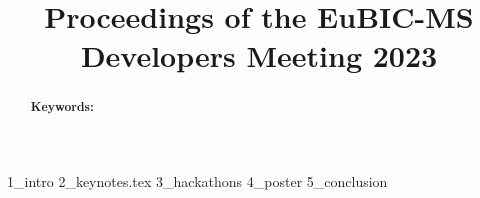 \documentclass[11pt,a4paper,DIV=21,abstract=true,twocolumn]{scrartcl}
\title{Proceedings of the EuBIC-MS Developers Meeting 2023}
\author{
	
}
\date{{\small Osaka \begin{CJK}{UTF8}{min}大阪市\end{CJK}, Japan, \today\ at \currenttime}}
\begin{document}
\maketitle

\begin{abstract}
	
	\vspace{0.5cm}
	\textbf{Keywords:
	}
	
\end{abstract}


 {1_intro}
 {2_keynotes.tex}
 {3_hackathons}
 {4_poster}
 {5_conclusion}

%

%


\begin{table*}[ht]
\centering
\label{tab:affiliation}

\caption{Author affiliation; grouped and ordered by affiliation.}
\end{table*}
\end{document}
